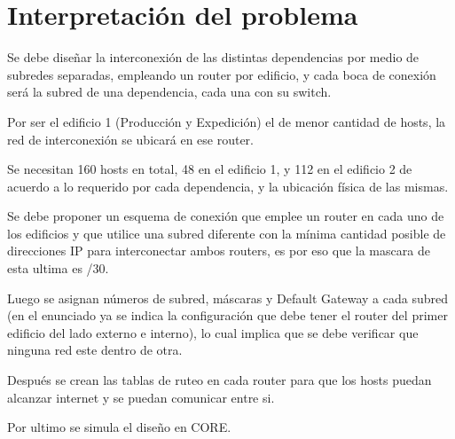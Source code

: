 \section{Interpretación del problema}
Se debe diseñar la interconexión de las distintas dependencias por medio de subredes separadas, empleando un router por edificio, y cada boca de conexión será la subred de una dependencia, cada una con su switch.

Por ser el edificio 1 (Producción y Expedición) el de menor cantidad de hosts, la red de interconexión se ubicará en ese router.

Se necesitan 160 hosts en total, 48 en el edificio 1, y 112 en el edificio 2 de acuerdo a lo requerido por cada dependencia, y la ubicación física de las mismas.

Se debe proponer un esquema de conexión que emplee un router en cada uno de los edificios y que utilice una subred diferente con la mínima cantidad posible de direcciones IP para interconectar ambos routers, es por eso que la mascara de esta ultima es /30.

Luego se asignan números de subred, máscaras y Default Gateway a cada subred (en el enunciado ya se indica la configuración que debe tener el router del primer edificio del lado externo e interno), lo cual implica que se debe verificar que ninguna red este dentro de otra.

Después se crean las tablas de ruteo en cada router para que los hosts puedan alcanzar internet y se puedan comunicar entre si.

Por ultimo se simula el diseño en CORE.

